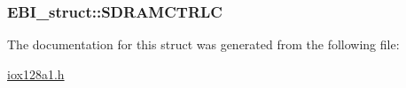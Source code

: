 \label{struct_e_b_i__struct_a885ea10229627298cbce3eeaf45b11e0}
\hypertarget{struct_e_b_i__struct_acca485a35336a380e6411d8f2fd3e130}{
\subsubsection[{SDRAMCTRLC}]{ {\bf EBI\_\-struct::SDRAMCTRLC}}}
\label{struct_e_b_i__struct_acca485a35336a380e6411d8f2fd3e130}


The documentation for this struct was generated from the following file:\begin{DoxyCompactItemize}
\item 
\hyperlink{iox128a1_8h}{iox128a1.h}\end{DoxyCompactItemize}

